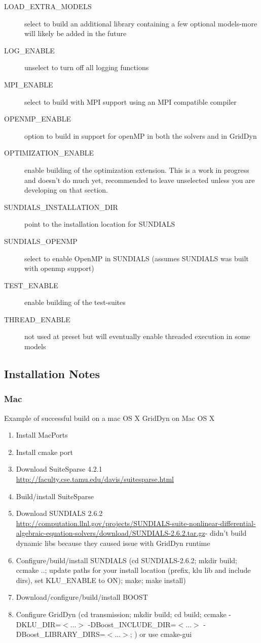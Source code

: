 \documentclass[12pt]{article} %
\begin{document}
\begin{description}
\item [LOAD\_EXTRA\_MODELS] select to build an additional library containing a few optional models-more will likely be added in the future
\item [LOG\_ENABLE]  unselect to turn off all logging functions
\item [MPI\_ENABLE] select to build with MPI support using an MPI compatible compiler
\item [OPENMP\_ENABLE] option to build in support for openMP in both the solvers and in GridDyn
\item [OPTIMIZATION\_ENABLE]  enable building of the optimization extension.  This is a work in progress and doesn't do much yet,  recommended to leave unselected unless you are developing on that section.
\item [SUNDIALS\_INSTALLATION\_DIR] point to the installation location for SUNDIALS
\item [SUNDIALS\_OPENMP]  select to enable OpenMP in SUNDIALS (assumes SUNDIALS was built with openmp support)
\item [TEST\_ENABLE]  enable building of the test-suites
\item [THREAD\_ENABLE]   not used at preset but will eventually enable threaded execution in some models
\end{description}

\subsection{Installation Notes}
\subsubsection{Mac}
Example of successful build on a mac OS X
GridDyn on Mac OS X

\begin{enumerate}
\item Install MacPorts
\item Install cmake port
\item Download SuiteSparse 4.2.1 \url{http://faculty.cse.tamu.edu/davis/suitesparse.html}
\item Build/install SuiteSparse
\item Download SUNDIALS 2.6.2 \url{http://computation.llnl.gov/projects/SUNDIALS-suite-nonlinear-differential-algebraic-equation-solvers/download/SUNDIALS-2.6.2.tar.gz}- didn't build dynamic libs because they caused issue with GridDyn runtime
\item Configure/build/install SUNDIALS (cd SUNDIALS-2.6.2; mkdir build; ccmake ..; update paths for your install location (prefix, klu lib and include dirs), set KLU\_ENABLE to ON); make; make install)
\item Download/configure/build/install BOOST
\item Configure GridDyn (cd transmission; mkdir build; cd build; ccmake -DKLU\_DIR=$<\hdots>$ -DBoost\_INCLUDE\_DIR=$<\hdots>$ -DBoost\_LIBRARY\_DIRS=$<\hdots>$; ) or use cmake-gui
\end{enumerate}
\end{document}
